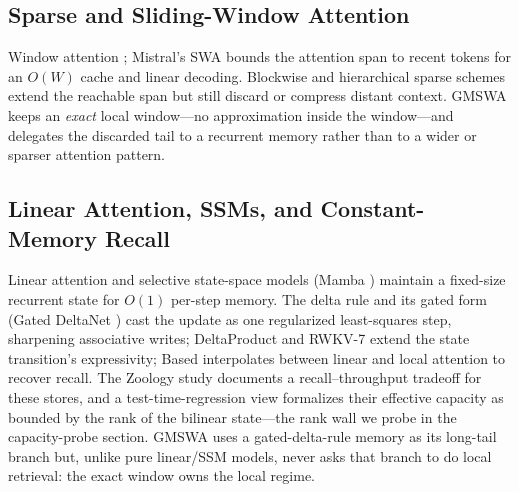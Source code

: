 \documentclass[letterpaper]{article} %
\begin{document}
\subsection{Sparse and Sliding-Window Attention}
Window attention \citep{longformer}; Mistral's SWA \citep{mistral_swa} bounds the attention span to recent tokens for an $O(W)$ cache and linear decoding. Blockwise and hierarchical sparse schemes extend the reachable span but still discard or compress distant context. GMSWA keeps an \emph{exact} local window---no approximation inside the window---and delegates the discarded tail to a recurrent memory rather than to a wider or sparser attention pattern.

\subsection{Linear Attention, SSMs, and Constant-Memory Recall}
Linear attention and selective state-space models (Mamba \citep{mamba2023}) maintain a fixed-size recurrent state for $O(1)$ per-step memory. The delta rule and its gated form (Gated DeltaNet \citep{gateddeltanet2024}) cast the update as one regularized least-squares step, sharpening associative writes; DeltaProduct \citep{deltaproduct2025} and RWKV-7 \citep{rwkv7_2025} extend the state transition's expressivity; Based \citep{based2024} interpolates between linear and local attention to recover recall. The Zoology study \citep{zoology2023} documents a recall--throughput tradeoff for these stores, and a test-time-regression view \citep{ttr2025} formalizes their effective capacity as bounded by the rank of the bilinear state---the rank wall we probe in the capacity-probe section. GMSWA uses a gated-delta-rule memory as its long-tail branch but, unlike pure linear/SSM models, never asks that branch to do local retrieval: the exact window owns the local regime.
\end{document}
